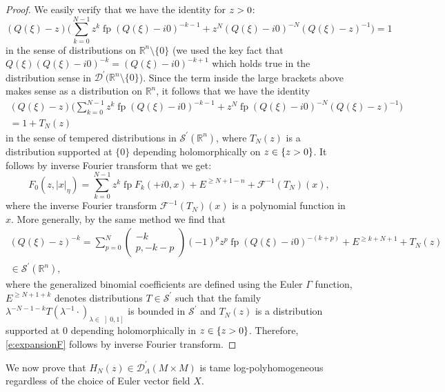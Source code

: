 \documentclass[JEP,XML,SOM,Unicode]{cedram}
\let\pazocal\mathscr
\theoremstyle{definition}
\let\euler X
\let\Im\relax
\DeclareMathOperator{\Im}{Im}
\DeclareMathOperator*{\pf}{fp}
\newcommand{\opencl}[1]{\mathopen{}\mathclose{\left]#1 \right]}}
\begin{document}
\begin{proof}
We easily verify that we have the identity for $\Im z>0$:
\[
(Q(\xi)-z) \biggl(\sum_{k=0}^{N-1} z^k\pf \left(Q(\xi)-i0\right)^{-k-1}+z^N\left(Q(\xi)-i0\right)^{-N} \left(Q(\xi)-z\right)^{-1}\biggr)=1
\]
in the sense of distributions on $\mathbb{R}^n\setminus \{0\}$ (we used the key fact that $Q(\xi)(Q(\xi)-i0)^{-k}=(Q(\xi)-i0)^{-k+1}$ which holds true in the distribution sense in $\pazocal{D}^\prime(\mathbb{R}^n\setminus\{0\}$).
{Since} the term inside the large brackets above makes sense as a distribution on $\mathbb{R}^n$,
it follows that we have the identity
\begin{multline*}
(Q(\xi)-z)\biggl(\sum_{k=0}^{N-1} z^k\pf \left(Q(\xi)-i0\right)^{-k-1}+z^N\pf\left(Q(\xi)-i0\right)^{-N} \left(Q(\xi)-z\right)^{-1}\biggr)\\
=1+T_N(z)
\end{multline*}
in the sense of tempered distributions in $\pazocal{S}^\prime(\mathbb{R}^n)$,
where $T_N(z)$ is a distribution supported at $\{0\}$ depending holomorphically on $z\in \{\Im z>0\}$.
It follows by inverse Fourier transform
that we get:
\[
F_{0}(z,\vert x\vert_\eta)=\sum_{k=0}^{N-1} z^k \pf F_{k}(+i0,x)+E^{\geqslant N+1-n}+\pazocal{F}^{-1}\left(T_N\right)(x),
\]
where the inverse Fourier transform
$\pazocal{F}^{-1}\left(T_N\right)(x)$ is a polynomial function in $x$.
More generally, by the same method we find that
\begin{multline*}
(Q(\xi)-z)^{-k}=\sum_{p=0}^N \begin{pmatrix}
-k\\
p,-k-p
\end{pmatrix} (-1)^pz^{p} {\pf (Q(\xi)-i0)^{-(k+p)}}+E^{\geqslant k+N+1 }+T_N(z)\\[-10pt]
\in \pazocal{S}^\prime(\mathbb{R}^n),
\end{multline*}
where the generalized binomial coefficients are defined using the
Euler $\Gamma$ function, $E^{\geqslant N+1+k } $ denotes distributions $T\in \pazocal{S}^\prime$
such that the family $ \lambda^{-N-1-k} T(\lambda^{-1}\cdot)_{\lambda\in \opencl{0,1}}$ is bounded in $\pazocal{S}^\prime$ and $T_N(z)$ is a distribution supported at $0$ depending holomorphically in $z\in \{\Im z>0\}$. Therefore, \eqref{e:expansionF}
follows by inverse Fourier transform.
\end{proof}

We now prove that $H_N(z)\in \pazocal{D}^\prime_\Lambda(M\times M)$ is tame log-polyhomogeneous regardless of the choice of Euler vector field $\euler$.
\end{document}
